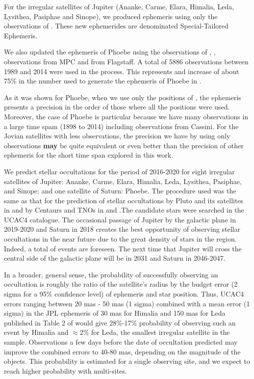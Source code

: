 \documentclass[useAMS,usenatbib]{mn2e}
\begin{document}
For the irregular satellites of Jupiter (Ananke, Carme, Elara, Himalia, Leda, Lysithea, Pasiphae and Sinope), we produced ephemeris using only the observations of . These new ephemerides are denominated Special-Tailored Ephemeris.

We also updated the ephemeris of Phoebe \citep{Desmars2013} using the observations of , \cite{Peng2015}, observations from  MPC and from Flagstaff. A total of 5886 observations between 1989 and 2014 were used in the process. This represents and increase of about 75\% in the number used to generate the ephemeris of Phoebe in \cite{Desmars2013}.

As it was shown for Phoebe, when we use only the positions of , the ephemeris presents a precision in the order of those where all the positions were used. Moreover, the case of Phoebe is particular because we have many observations in a large time spam (1898 to 2014) including observations from Cassini. For the Jovian satellites with less observations, the precision we have by using only  observations \textbf{may} be quite equivalent or even better than the precision of other ephemeris for the short time span explored in this work.

We predict stellar occultations for the period of 2016-2020 for eight irregular satellites of Jupiter: Ananke, Carme, Elara, Himalia, Leda, Lysithea, Pasiphae, and Sinope; and one satellite of Saturn: Phoebe. The procedure used was the same as that for the prediction of stellar occultations by Pluto and its satellites in \cite{Assafin2010} and by Centaurs and TNOs in \cite{Assafin2012} and \cite{Camargo2014}.The candidate stars were searched in the UCAC4 catalogue. The occasional passage of Jupiter by the galactic plane in 2019-2020 and Saturn in 2018 creates the best opportunity of observing stellar occultations in the near future due to the great density of stars in the region. Indeed, a total of \noccs events are foreseen. The next time that Jupiter will cross the central side of the galactic plane will be in 2031 and Saturn in 2046-2047.

In a broader, general sense, the probability of successfully observing an occultation is roughly the ratio of the satellite's radius by the budget error (2 sigma for a 95\% confidence level) of ephemeris and star position. Thus, UCAC4 errors ranging between 20 mas - 50 mas (1 sigma) combined with a mean error (1 sigma) in the JPL ephemeris of 30 mas for Himalia and 150 mas for Leda published in Table 2 of \cite{Jacobson2012} would give 28\%-17\% probability of observing such an event by Himalia and $\approx2$\% for Leda, the smallest irregular satellite in the sample. Observations a few days before the date of occultation predicted may improve the combined errors to 40-80 mas, depending on the magnitude of the objects. This probability is estimated for a single observing site, and we expect to reach higher probability with multi-sites.
\end{document}
